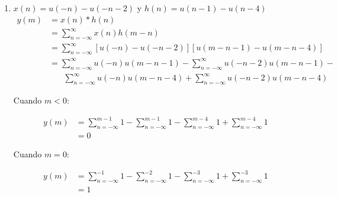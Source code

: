 \documentclass[a4paper,12pt,final]{article}
\begin{document}
\begin{enumerate}[label=\alph*)]
        \item $x\left(n\right) = u\left(-n\right) - u\left(-n-2\right)$ y $h\left(n\right) = u\left(n-1\right) - u\left(n-4\right)$
          \begin{equation*}
            \begin{split}
              y\left(m\right) & = x\left(n\right) * h\left(n\right) \\
                              & = \sum_{n=-\infty}^{\infty} x\left(n\right)h\left(m-n\right) \\
                              & = \sum_{n=-\infty}^{\infty} \left[u\left(-n\right) - u\left(-n-2\right)\right]
                                                            \left[u\left(m-n-1\right) - u\left(m-n-4\right)\right] \\
                              & = \sum_{n=-\infty}^{\infty} u\left(-n\right)u\left(m-n-1\right) - \sum_{n=-\infty}^{\infty} u\left(-n-2\right)u\left(m-n-1\right) - \\
                              & \phantom{=}\ \,\sum_{n=-\infty}^{\infty} u\left(-n\right)u\left(m-n-4\right) + \sum_{n=-\infty}^{\infty} u\left(-n-2\right)u\left(m-n-4\right)
            \end{split}
          \end{equation*}
          \vfill
          \newpage

          \noindent Cuando $m<0$:

          \begin{equation*}
            \begin{split}
              y\left(m\right) & = \sum_{n=-\infty}^{m-1} 1 -
                                  \sum_{n=-\infty}^{m-1} 1 -
                                  \sum_{n=-\infty}^{m-4} 1 +
                                  \sum_{n=-\infty}^{m-4} 1 \\
                              & = 0
            \end{split}
          \end{equation*}

          \noindent Cuando $m=0$:

          \begin{equation*}
            \begin{split}
              y\left(m\right) & = \sum_{n=-\infty}^{-1} 1 -
                                  \sum_{n=-\infty}^{-2} 1 -
                                  \sum_{n=-\infty}^{-3} 1 +
                                  \sum_{n=-\infty}^{-3} 1 \\
                              & = 1
            \end{split}
          \end{equation*}


\end{enumerate}
\end{document}

